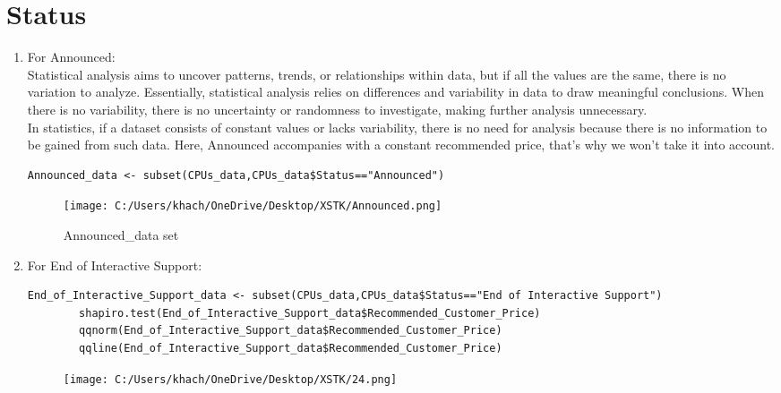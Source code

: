 \documentclass[a4paper]{article}
\begin{document}
	\section*{Status}
	\begin{enumerate}
		\item For Announced:\\
		Statistical analysis aims to uncover patterns, trends, or relationships within data, but if all the values are the same, there is no variation to analyze. Essentially, statistical analysis relies on differences and variability in data to draw meaningful conclusions. When there is no variability, there is no uncertainty or randomness to investigate, making further analysis unnecessary.\\
		In statistics, if a dataset consists of constant values or lacks variability, there is no need for analysis because there is no information to be gained from such data. Here, Announced accompanies with a constant recommended price, that's why we won't take it into account.
	\begin{lstlisting}[frame=single, backgroundcolor=\color{gray!10}, breaklines=true, columns=fullflexible]
	Announced_data <- subset(CPUs_data,CPUs_data$Status=="Announced")
	\end{lstlisting}
		\begin{figure}[htbp]
			\centering
			\begin{adjustbox}{width=0.9\textwidth, frame}
				\texttt{[image: C:/Users/khach/OneDrive/Desktop/XSTK/Announced.png]}
			\end{adjustbox}
			\captionsetup{justification=centering}
			\vspace{0.5cm}
			\caption{Announced\_data set}
	\end{figure}
		\item For End of Interactive Support:
		\begin{lstlisting}[frame=single, backgroundcolor=\color{gray!10}, breaklines=true, columns=fullflexible]
		End_of_Interactive_Support_data <- subset(CPUs_data,CPUs_data$Status=="End of Interactive Support")
		shapiro.test(End_of_Interactive_Support_data$Recommended_Customer_Price)
		qqnorm(End_of_Interactive_Support_data$Recommended_Customer_Price)
		qqline(End_of_Interactive_Support_data$Recommended_Customer_Price)
		\end{lstlisting}
		\begin{figure}[htbp]
			\centering
			\begin{adjustbox}{width=0.7\textwidth, frame}
				\texttt{[image: C:/Users/khach/OneDrive/Desktop/XSTK/24.png]}

\end{adjustbox}
\end{figure}
\end{enumerate}
\end{document}
